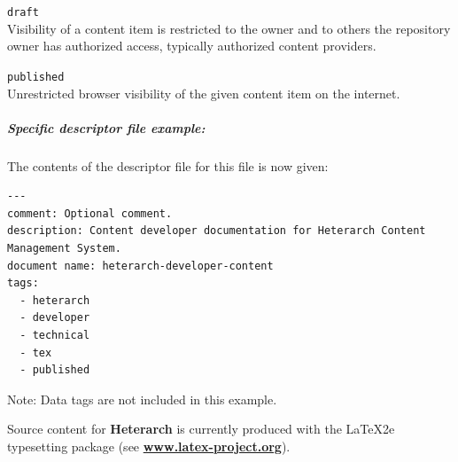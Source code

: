 \documentclass[12pt]{article}
\begin{document}
\begin{description}
\begin{description}
		\item{\tt draft}\\
		Visibility of a content item is restricted to the owner and to others the repository owner has authorized access, typically authorized content providers.
		\item{\tt published}\\
		Unrestricted browser visibility of the given content item on the internet.
	\end{description}
\end{description}

\subparagraph{\bf Specific descriptor file example:} The contents of the descriptor file for this file is now given:

\begin{verbatim}
---
comment: Optional comment.
description: Content developer documentation for Heterarch Content Management System.
document name: heterarch-developer-content
tags:
  - heterarch
  - developer
  - technical
  - tex
  - published
\end{verbatim}
Note: Data tags are not included in this example.

Source content for {\bf\small Heterarch} is currently produced with the \LaTeX2e\,typesetting package (see \href{http://www.latex-project.org/}{\bf www.latex-project.org}).
\end{document}
